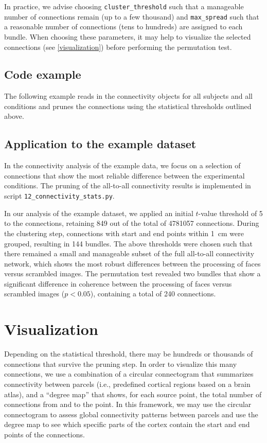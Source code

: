 \documentclass[utf8]{frontiersSCNS}
\newcommand{\code}[1]{\lstinline{#1}}
\begin{document}
In practice, we advise choosing \code{cluster_threshold} such that a manageable number of connections remain (up to a few thousand) and \code{max_spread} such that a reasonable number of connections (tens to hundreds) are assigned to each bundle.
When choosing these parameters, it may help to visualize the selected connections (see \autoref{visualization}) before performing the permutation test.

\subsection{Code example}

The following example reads in the connectivity objects for all subjects and all conditions and prunes the connections using the statistical thresholds outlined above.



\subsection{Application to the example dataset}

In the connectivity analysis of the example data, we focus on a selection of connections that show the most reliable difference between the experimental conditions.
The pruning of the all-to-all connectivity results is implemented in script \code{12_connectivity_stats.py}. 

In our analysis of the example dataset, we applied an initial $t$-value threshold of 5 to the connections, retaining 849 out of the total of 4781057 connections.
During the clustering step, connections with start and end points within \SI{1}{\centi\meter} were grouped, resulting in 144 bundles.
The above thresholds were chosen such that there remained a small and manageable subset of the full all-to-all connectivity network, which shows the most robust differences between the processing of faces versus scrambled images.
The permutation test revealed two bundles that show a significant difference in coherence between the processing of faces versus scrambled images ($p < 0.05$), containing a total of 240 connections.


\section{Visualization}\label{visualization}

Depending on the statistical threshold, there may be hundreds or thousands of connections that survive the pruning step.
In order to visualize this many connections, we use a combination of a circular connectogram that summarizes connectivity between parcels (i.e., predefined cortical regions based on a brain atlas), and a ``degree map'' that shows, for each source point, the total number of connections from and to the point.
In this framework, we may use the circular connectogram to assess global connectivity patterns between parcels and use the degree map to see which specific parts of the cortex contain the start and end points of the connections.
\end{document}

